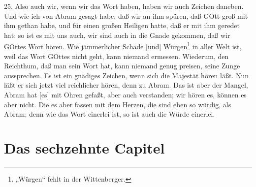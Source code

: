 25. Also auch wir, wenn wir das Wort haben, haben wir auch Zeichen daneben. Und wie ich von Abram gesagt habe, daß wir an ihm spüren, daß GOtt groß mit ihm gethan habe, und für einen
großen Heiligen hatte, daß er mit ihm geredet hat: so ist es mit uns auch, wir sind auch in die Gnade gekommen, daß wir GOttes Wort hören. Wie jämmerlicher Schade [und] Würgen\footnote{„Würgen“ fehlt in der Wittenberger.} in aller Welt ist, weil das Wort GOttes nicht geht, kann niemand ermessen. Wiederum, den Reichthum, daß man sein Wort hat, kann niemand genug preisen, seine Zunge aussprechen. Es ist ein gnädiges Zeichen, wenn sich die Majestät hören läßt. Nun läßt er sich jetzt viel reichlicher hören, denn zu Abram. Das ist aber der Mangel, Abram hat [es] mit Ohren gefaßt, aber auch verstanden; wir hören es, können es aber nicht. Die es aber fassen mit dem Herzen, die sind eben so würdig, als Abram; denn wie das Wort einerlei ist, so ist auch die Würde einerlei.

\section{Das sechzehnte Capitel}


